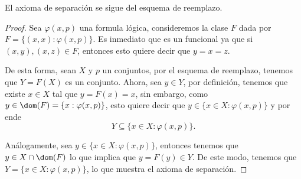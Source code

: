 \begin{exercise}[1.14]
  El axioma de separación se sigue del esquema de reemplazo.
\end{exercise}
\begin{proof}
  Sea $\varphi(x,p)$ una formula lógica, consideremos la clase $F$ dada por $F = \{ (x,x) : \varphi(x,p) \}$. Es inmediato que es un funcional ya que si $(x,y), (x,z) \in F$, entonces esto quiere decir que $y = x= z$.

  De esta forma, sean $X$ y $p$ un conjuntos, por el esquema de reemplazo, tenemos que $Y = F(X)$ es un conjunto. Ahora, sea $y \in Y$, por definición, tenemos que existe $x \in X$ tal que $ y = F(x) = x$, sin embargo, como $y \in \dom(F) = \{x : \varphi(x,p)\}$, esto quiere decir que $y \in \{x \in X : \varphi(x,p)\}$ y por ende
  \[
    Y \subseteq \{x \in X : \varphi(x,p)\}.
  \]

  Análogamente, sea $y \in \{x \in X : \varphi(x,p)\}$, entonces tenemos que $y \in X \cap \dom(F)$ lo que implica que $y = F(y) \in Y$. De este modo, tenemos que $Y = \{x \in X : \varphi(x,p)\}$, lo que muestra el axioma de separación.
\end{proof}